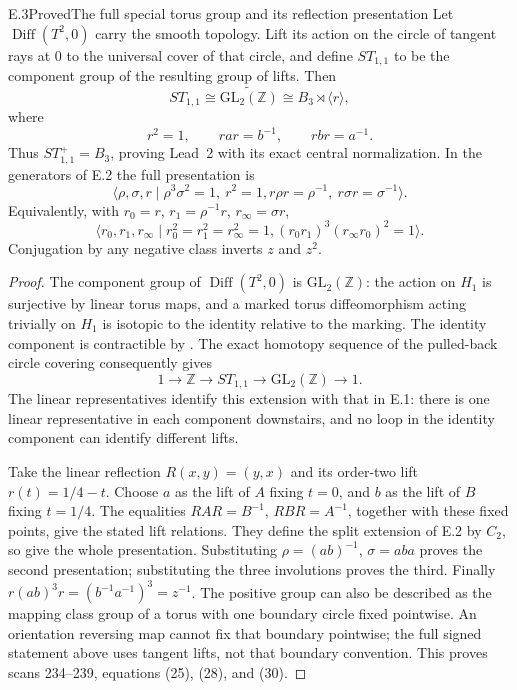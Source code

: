 \begin{statement}{E.3}{Proved}{The full special torus group and its reflection presentation}
Let $\operatorname{Diff}(T^2,0)$ carry the smooth topology.  Lift its
action on the circle of tangent rays at $0$ to the universal cover
of that circle, and define $ST_{1,1}$ to be the component group of
the resulting group of lifts.  Then
\[
 ST_{1,1}\cong\widetilde{\mathrm{GL}_2(\mathbb Z)}
 \cong B_3\rtimes\langle r\rangle,
\]
where
\[
 r^2=1,\qquad rar=b^{-1},\qquad rbr=a^{-1}.
\]
Thus $ST_{1,1}^{+}=B_3$, proving Lead~2 with its exact central
normalization.  In the generators of E.2 the full presentation is
\[
 \langle\rho,\sigma,r\mid
 \rho^3\sigma^2=1,\ r^2=1,
 r\rho r=\rho^{-1},\ r\sigma r=\sigma^{-1}\rangle.
\]
Equivalently, with $r_0=r$, $r_1=\rho^{-1}r$, $r_\infty=\sigma r$,
\[
 \langle r_0,r_1,r_\infty\mid r_0^2=r_1^2=r_\infty^2=1,
 (r_0r_1)^3(r_\infty r_0)^2=1\rangle.
\]
Conjugation by any negative class inverts $z$ and $z^2$.
\end{statement}
\begin{proof}
The component group of $\operatorname{Diff}(T^2,0)$ is
$\mathrm{GL}_2(\mathbb Z)$: the action on $H_1$ is surjective by
linear torus maps, and a marked torus diffeomorphism acting trivially
on $H_1$ is isotopic to the identity relative to the marking.  The
identity component is contractible by
\citet[Theorem~1(b)]{EarleEells1967}.  The exact homotopy sequence of
the pulled-back circle covering consequently gives
\[
 1\to\mathbb Z\to ST_{1,1}\to\mathrm{GL}_2(\mathbb Z)\to1.
\]
The linear representatives identify this extension with that in E.1:
there is one linear representative in each component downstairs,
and no loop in the identity component can identify different lifts.

Take the linear reflection $R(x,y)=(y,x)$ and its order-two lift
$r(t)=1/4-t$.  Choose $a$ as the lift of $A$ fixing $t=0$, and $b$
as the lift of $B$ fixing $t=1/4$.  The equalities
$RAR=B^{-1}$, $RBR=A^{-1}$, together with these fixed points, give
the stated lift relations.  They define the split extension of
E.2 by $C_2$, so give the whole presentation.  Substituting
$\rho=(ab)^{-1}$, $\sigma=aba$ proves the second presentation;
substituting the three involutions proves the third.  Finally
$r(ab)^3r=(b^{-1}a^{-1})^3=z^{-1}$.
The positive group can also be described as the mapping class group
of a torus with one boundary circle fixed pointwise.  An orientation
reversing map cannot fix that boundary pointwise; the full signed
statement above uses tangent lifts, not that boundary convention.
This proves scans 234--239, equations (25), (28), and (30).
\end{proof}

